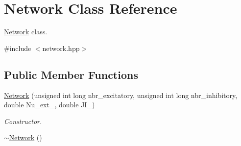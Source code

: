 \hypertarget{classNetwork}{\section{Network Class Reference}
\label{classNetwork}
}


\hyperlink{classNetwork}{Network} class.  




{\ttfamily \#include $<$network.\-hpp$>$}

\subsection*{Public Member Functions}
\begin{DoxyCompactItemize}
\item 
\hyperlink{classNetwork_abafb9fc91049cb513d81acf2b7b3540c}{Network} (unsigned int long nbr\-\_\-excitatory, unsigned int long nbr\-\_\-inhibitory, double Nu\-\_\-ext\-\_\-, double J\-I\-\_\-)
\begin{DoxyCompactList}\small\item\em Constructor. \end{DoxyCompactList}\item 
\hypertarget{classNetwork_a7a4e19cdb4bf0c7ecf82baa643831492}{\hyperlink{classNetwork_a7a4e19cdb4bf0c7ecf82baa643831492}{$\sim$\-Network} ()}\label{classNetwork_a7a4e19cdb4bf0c7ecf82baa643831492}


\end{DoxyCompactItemize}
